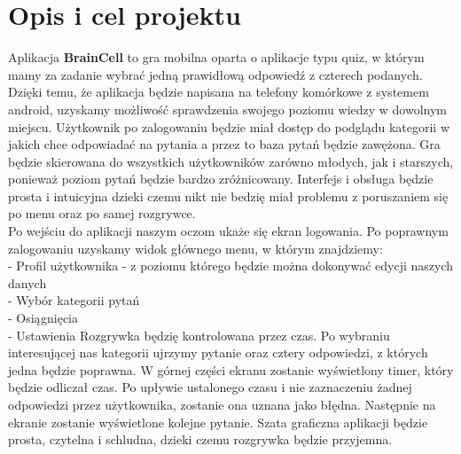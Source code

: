 	\newpage
\section{Opis i cel projektu}		%
Aplikacja \textbf{BrainCell} to gra mobilna oparta o aplikacje typu quiz, w którym mamy za zadanie wybrać jedną prawidłową odpowiedź z czterech podanych. Dzięki temu, że aplikacja będzie napisana na telefony komórkowe z systemem android, uzyskamy możliwość sprawdzenia swojego poziomu wiedzy w dowolnym miejscu. Użytkownik po zalogowaniu będzie miał dostęp do podglądu kategorii w jakich chce odpowiadać na pytania a przez to baza pytań będzie zawężona. Gra będzie skierowana do wszystkich użytkowników zarówno młodych, jak i starszych, ponieważ poziom pytań będzie bardzo zróżnicowany. Interfejs i obsługa będzie prosta i intuicyjna dzieki czemu nikt nie bedzię miał problemu z poruszaniem się po menu oraz po samej rozgrywce. 
\\Po wejściu do aplikacji naszym oczom ukaże się ekran logowania. Po poprawnym zalogowaniu uzyskamy widok głównego menu, w którym znajdziemy:
\\- Profil użytkownika - z poziomu którego będzie można dokonywać edycji naszych danych
\\- Wybór kategorii pytań
\\- Osiągnięcia
\\- Ustawienia
\newline Rozgrywka będzię kontrolowana przez czas. Po wybraniu interesującej nas kategorii ujrzymy pytanie oraz cztery odpowiedzi, z których jedna będzie poprawna. W górnej części ekranu zostanie wyświetlony timer, który będzie odliczał czas. Po upływie ustalonego czasu i nie zaznaczeniu żadnej odpowiedzi przez użytkownika, zostanie ona uznana jako błędna. Następnie na ekranie zostanie wyświetlone kolejne pytanie.
\newline Szata graficzna aplikacji będzie prosta, czytelna i schludna, dzieki czemu rozgrywka będzie przyjemna.

